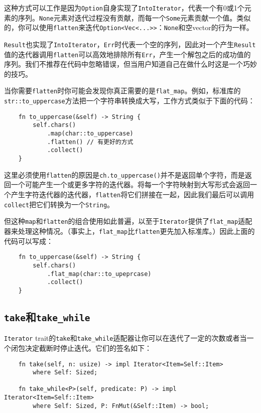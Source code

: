 这种方式可以工作是因为\texttt{Option}自身实现了\texttt{IntoIterator}，代表一个有0或1个元素的序列。\texttt{None}元素对迭代过程没有贡献，而每一个\texttt{Some}元素贡献一个值。类似的，你可以使用\texttt{flatten}来迭代\texttt{Option<Vec<...>>}：\texttt{None}和空vector的行为一样。

\texttt{Result}也实现了\texttt{IntoIterator}，\texttt{Err}时代表一个空的序列，因此对一个产生\texttt{Result}值的迭代器调用\texttt{flatten}可以高效地排除所有\texttt{Err}，产生一个解包之后的成功值的序列。我们不推荐在代码中忽略错误，但当用户知道自己在做什么时这是一个巧妙的技巧。

当你需要\texttt{flatten}时你可能会发现你真正需要的是\texttt{flat\_map}。例如，标准库的\texttt{str::to\_uppercase}方法把一个字符串转换成大写，工作方式类似于下面的代码：
\begin{verbatim}
    fn to_uppercase(&self) -> String {
        self.chars()
            .map(char::to_uppercase)
            .flatten() // 有更好的方式
            .collect()
    }
\end{verbatim}

这里必须使用\texttt{flatten}的原因是\texttt{ch.to\_uppercase()}并不是返回单个字符，而是返回一个可能产生一个或更多字符的迭代器。将每一个字符映射到大写形式会返回一个产生字符迭代器的迭代器，\texttt{flatten}将它们拼接在一起，因此我们最后可以调用\texttt{collect}把它们转换为一个\texttt{String}。

但这种\texttt{map}和\texttt{flatten}的组合使用如此普遍，以至于\texttt{Iterator}提供了\texttt{flat\_map}适配器来处理这种情况。（事实上，\texttt{flat\_map}比\texttt{flatten}更先加入标准库。）因此上面的代码可以写成：
\begin{verbatim}
    fn to_uppercase(&self) -> String {
        self.chars()
            .flat_map(char::to_upeprcase)
            .collect()
    }
\end{verbatim}

\subsection{\texttt{take}和\texttt{take\_while}}
\texttt{Iterator} trait的\texttt{take}和\texttt{take\_while}适配器让你可以在迭代了一定的次数或者当一个闭包决定截断时停止迭代。它们的签名如下：
\begin{verbatim}
    fn take(self, n: usize) -> impl Iterator<Item=Self::Item>
        where Self: Sized;
    
    fn take_while<P>(self, predicate: P) -> impl Iterator<Item=Self::Item>
        where Self: Sized, P: FnMut(&Self::Item) -> bool;
\end{verbatim}

